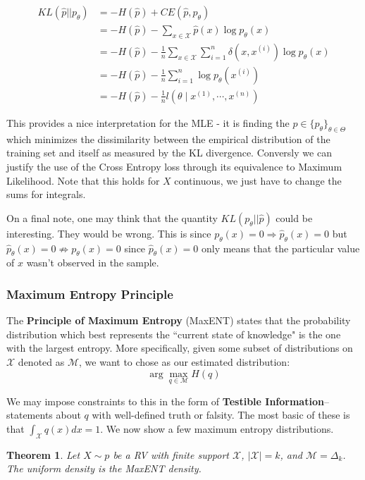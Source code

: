 \documentclass[]{article}
\theoremstyle{mattstyle}
\newtheorem{theorem}{Theorem}[section]
\theoremstyle{definition}
\begin{document}
\begin{align*}
KL(\hat{p}||p_{\theta}) &= -H(\hat{p}) + CE(\hat{p},p_{\theta}) \\
&= -H(\hat{p}) - \sum_{x\in\mathcal{X}}\hat{p}(x)\log p_{\theta}(x)\\
&= -H(\hat{p}) - \frac{1}{n}\sum_{x\in\mathcal{X}}\sum_{i=1}^n\delta(x,x^{(i)}) \log p_{\theta}(x)\\
&= -H(\hat{p}) - \frac{1}{n}\sum_{i=1}^n\log p_{\theta}(x^{(i)})\\
&= -H(\hat{p}) - \frac{1}{n}l(\theta \mid x^{(1)}, \cdots, x^{(n)})
\end{align*}

This provides a nice interpretation for the MLE - it is finding the $p\in \{p_{\theta}\}_{\theta\in\Theta}$ which minimizes the dissimilarity between the empirical distribution of the training set and itself as measured by the KL divergence. Conversly we can justify the use of the Cross Entropy loss through its equivalence to Maximum Likelihood. Note that this holds for $X$ continuous, we just have to change the sums for integrals.

On a final note, one may think that the quantity $KL(p_{\theta}|| \hat{p})$ could be interesting. They would be wrong. This is since $p_{\theta}(x)=0 \Rightarrow \hat{p}_{\theta}(x)=0$ but $\hat{p}_{\theta}(x)=0 \not\Rightarrow p_{\theta}(x)=0$ since $\hat{p}_{\theta}(x)=0$ only means that the particular value of $x$ wasn't observed in the sample.	


\subsubsection{Maximum Entropy Principle}

The \textbf{Principle of Maximum Entropy} (MaxENT) states that the probability distribution which best represents the ``current state of knowledge" is the one with the largest entropy. More specifically, given some subset of distributions on $\mathcal{X}$ denoted as $\mathcal{M}$, we want to chose as our estimated distribution:
$$\arg\max\limits_{q \in \mathcal{M}} H(q)$$

We may impose constraints to this in the form of \textbf{Testible Information}-- statements about $q$ with well-defined truth or falsity. The most basic of these is that $\int_{\mathcal{X}}^{} q(x)dx = 1$. We now show a few maximum entropy distributions. 

\newpage

\begin{theorem}\label{th:unifentlim}
Let $X\sim p$ be a RV with finite support $\mathcal{X}$, $|\mathcal{X}|=k$, and $\mathcal{M} = \Delta_{k}$. The uniform density is the MaxENT density.
\end{theorem}
\end{document}
